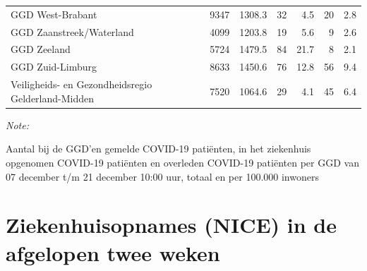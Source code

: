 \documentclass[
  english,
  man,floatsintext]{apa6}
\begin{document}
\begin{table}
\begin{threeparttable}
\begin{tabular}{lrrrrrr}
GGD West-Brabant & 9347 & 1308.3 & 32 & 4.5 & 20 & 2.8\\
GGD Zaanstreek/Waterland & 4099 & 1203.8 & 19 & 5.6 & 9 & 2.6\\
GGD Zeeland & 5724 & 1479.5 & 84 & 21.7 & 8 & 2.1\\
GGD Zuid-Limburg & 8633 & 1450.6 & 76 & 12.8 & 56 & 9.4\\
Veiligheids- en Gezondheidsregio Gelderland-Midden & 7520 & 1064.6 & 29 & 4.1 & 45 & 6.4\\
\bottomrule
\end{tabular}
\begin{tablenotes}
\item \textit{Note: } 
\item Aantal bij de GGD’en gemelde COVID-19 patiënten, in het ziekenhuis opgenomen COVID-19 patiënten en overleden COVID-19 patiënten per GGD van 07 december t/m 21 december 10:00 uur, totaal en per 100.000 inwoners
\end{tablenotes}
\end{threeparttable}
\endgroup{}
\end{table}

\newpage

\hypertarget{ziekenhuisopnames-nice-in-de-afgelopen-twee-weken}{%
\section{Ziekenhuisopnames (NICE) in de afgelopen twee weken}\label{ziekenhuisopnames-nice-in-de-afgelopen-twee-weken}}
\end{document}
